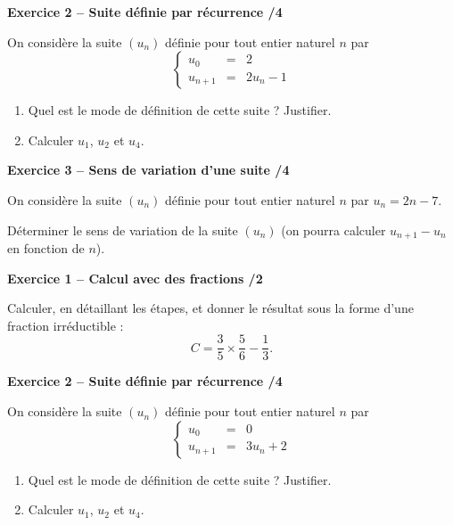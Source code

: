 \documentclass[10pt,a4paper]{article}
\begin{document}
\vspace{3cm}

\textbf{Exercice 2 -- Suite définie par récurrence \hfill /4}

On considère la suite \((u_n)\) définie pour tout entier naturel \(n\) par
\[
\left\{\begin{array}{rcl}
u_0 &=& 2 \\
u_{n+1} &=& 2u_n-1
\end{array}\right.
\]

\begin{enumerate}
\item Quel est le mode de définition de cette suite ? Justifier.

\vspace{2cm}

\item Calculer \(u_1\), \(u_2\) et \(u_4\).
\end{enumerate}

\vspace{3cm}

\textbf{Exercice 3 -- Sens de variation d'une suite \hfill /4}

On considère la suite \((u_n)\) définie pour tout entier naturel \(n\) par \(u_n=2n-7\).

Déterminer le sens de variation de la suite \((u_n)\) (on pourra calculer \(u_{n+1}-u_n\) en fonction de \(n\)).

\newpage



\textbf{Exercice 1 -- Calcul avec des fractions \hfill /2}

Calculer, en détaillant les étapes, et donner le résultat sous la forme d'une fraction irréductible :
\[
C = \frac{3}{5}\times\frac{5}{6}-\frac{1}{3}.
\]

\vspace{3cm}

\textbf{Exercice 2 -- Suite définie par récurrence \hfill /4}

On considère la suite \((u_n)\) définie pour tout entier naturel \(n\) par
\[
\left\{\begin{array}{rcl}
u_0 &=& 0 \\
u_{n+1} &=& 3u_n+2
\end{array}\right.
\]

\begin{enumerate}
\item Quel est le mode de définition de cette suite ? Justifier.

\vspace{2cm}

\item Calculer \(u_1\), \(u_2\) et \(u_4\).
\end{enumerate}
\end{document}
